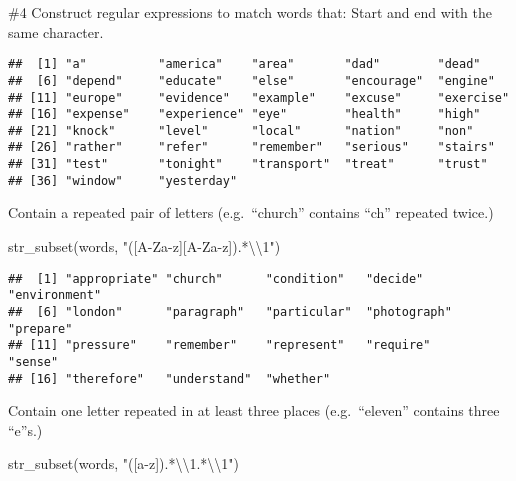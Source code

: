 \documentclass[
]{article}
\newenvironment{Shaded}{\begin{snugshade}}{\end{snugshade}}
\newcommand{\FunctionTok}[1]{\textcolor[rgb]{0.00,0.00,0.00}{#1}}
\newcommand{\NormalTok}[1]{#1}
\newcommand{\SpecialCharTok}[1]{\textcolor[rgb]{0.00,0.00,0.00}{#1}}
\newcommand{\StringTok}[1]{\textcolor[rgb]{0.31,0.60,0.02}{#1}}
\begin{document}
\#4 Construct regular expressions to match words that: Start and end
with the same character.

\begin{Shaded}
\end{Shaded}

\begin{verbatim}
##  [1] "a"          "america"    "area"       "dad"        "dead"      
##  [6] "depend"     "educate"    "else"       "encourage"  "engine"    
## [11] "europe"     "evidence"   "example"    "excuse"     "exercise"  
## [16] "expense"    "experience" "eye"        "health"     "high"      
## [21] "knock"      "level"      "local"      "nation"     "non"       
## [26] "rather"     "refer"      "remember"   "serious"    "stairs"    
## [31] "test"       "tonight"    "transport"  "treat"      "trust"     
## [36] "window"     "yesterday"
\end{verbatim}

Contain a repeated pair of letters (e.g.~``church'' contains ``ch''
repeated twice.)

\begin{Shaded}
\begin{Highlighting}[]
\FunctionTok{str\_subset}\NormalTok{(words, }\StringTok{"([A{-}Za{-}z][A{-}Za{-}z]).*}\SpecialCharTok{\textbackslash{}\textbackslash{}}\StringTok{1"}\NormalTok{)}
\end{Highlighting}
\end{Shaded}

\begin{verbatim}
##  [1] "appropriate" "church"      "condition"   "decide"      "environment"
##  [6] "london"      "paragraph"   "particular"  "photograph"  "prepare"    
## [11] "pressure"    "remember"    "represent"   "require"     "sense"      
## [16] "therefore"   "understand"  "whether"
\end{verbatim}

Contain one letter repeated in at least three places (e.g.~``eleven''
contains three ``e''s.)

\begin{Shaded}
\begin{Highlighting}[]
\FunctionTok{str\_subset}\NormalTok{(words, }\StringTok{"([a{-}z]).*}\SpecialCharTok{\textbackslash{}\textbackslash{}}\StringTok{1.*}\SpecialCharTok{\textbackslash{}\textbackslash{}}\StringTok{1"}\NormalTok{)}
\end{Highlighting}
\end{Shaded}
\end{document}
